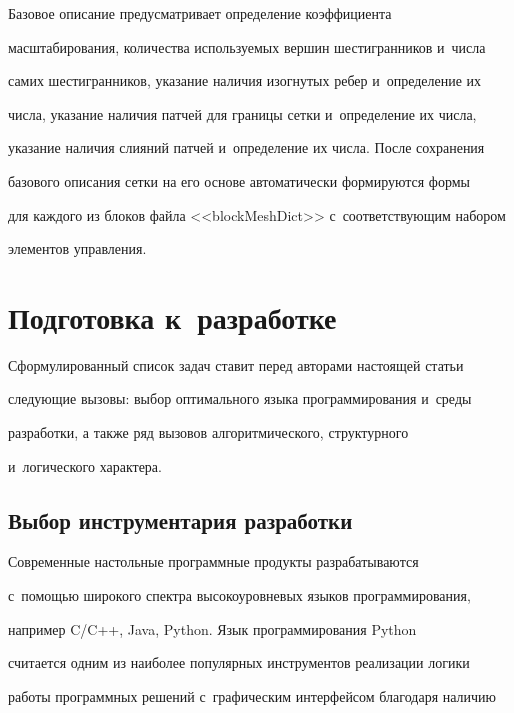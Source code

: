    


   Базовое описание предусматривает определение коэффициента 


масштабирования, количества используемых вершин шестигранников и~числа 


самих шестигранников, указание наличия изогнутых ребер и~определение их 


числа, указание наличия патчей для границы сетки и~определение их числа, 


указание наличия слияний патчей и~определение их числа. После сохранения 


базового описания сетки на его основе автоматически формируются формы 


для каждого из блоков файла <<blockMeshDict>> с~соответствующим набором 


элементов управления.


   


\section{Подготовка к~разработке}





  Сформулированный список задач ставит перед авторами настоящей статьи 


следующие вызовы: выбор оптимального языка программирования и~среды 


разработки, а также ряд вызовов алгоритмического, структурного 


и~логического характера.


  


\subsection{Выбор инструментария разработки}





  Современные настольные программные продукты разрабатываются 


с~по\-мощью широкого спектра высокоуровневых языков программирования, 


например C\!/\!C++, Java, Python. Язык программирования Python~\cite{9-ch} 


считается одним из наиболее популярных инструментов реализации логики 


работы программных решений с~графическим интерфейсом благодаря наличию 


